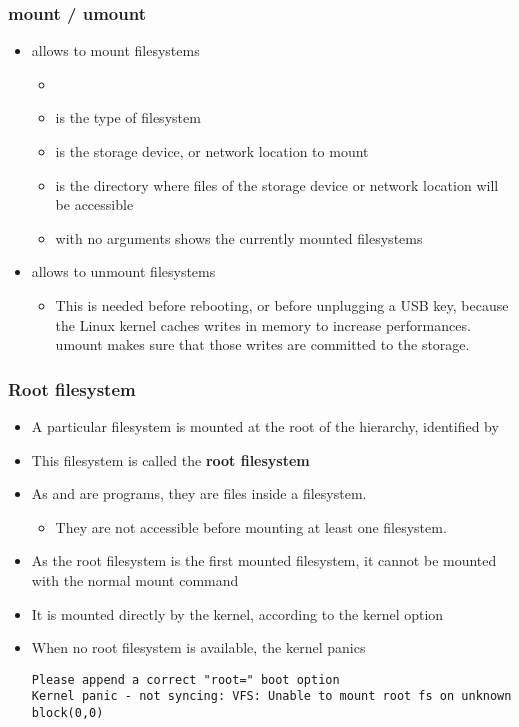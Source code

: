 \begin{frame}
  \frametitle{mount / umount}
  \begin{itemize}
  \item {} allows to mount filesystems
    \begin{itemize}
    \item {}
    \item {} is the type of filesystem
    \item {} is the storage device, or network location to
      mount
    \item {} is the directory where files of the
      storage device or network location will be accessible
    \item {} with no arguments shows the currently mounted
      filesystems
    \end{itemize}
  \item {} allows to unmount filesystems
    \begin{itemize}
    \item This is needed before rebooting, or before unplugging a USB
      key, because the Linux kernel caches writes in memory to
      increase performances. umount makes sure that those writes are
      committed to the storage.
    \end{itemize}
  \end{itemize}
\end{frame}

\begin{frame}[fragile]
  \frametitle{Root filesystem}
  \begin{itemize}
  \item A particular filesystem is mounted at the root of the hierarchy,
    identified by \code{/}
  \item This filesystem is called the {\bf root filesystem}
  \item As  and  are programs, they are files
    inside a filesystem.
    \begin{itemize}
    \item They are not accessible before mounting at least one filesystem.
    \end{itemize}
  \item As the root filesystem is the first mounted filesystem, it
    cannot be mounted with the normal mount command
  \item It is mounted directly by the kernel, according to the
     kernel option
  \item When no root filesystem is available, the kernel panics\\
    \tiny
\begin{verbatim}
Please append a correct "root=" boot option
Kernel panic - not syncing: VFS: Unable to mount root fs on unknown block(0,0)
\end{verbatim}
  \end{itemize}
\end{frame}

